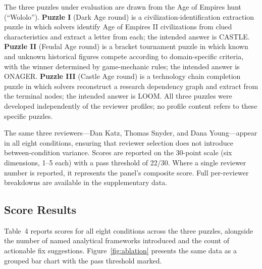 The three puzzles under evaluation are drawn from the Age of Empires hunt (``Wololo''). \textbf{Puzzle I} (Dark Age round) is a civilization-identification extraction puzzle in which solvers identify Age of Empires II civilizations from clued characteristics and extract a letter from each; the intended answer is CASTLE. \textbf{Puzzle II} (Feudal Age round) is a bracket tournament puzzle in which known and unknown historical figures compete according to domain-specific criteria, with the winner determined by game-mechanic rules; the intended answer is ONAGER. \textbf{Puzzle III} (Castle Age round) is a technology chain completion puzzle in which solvers reconstruct a research dependency graph and extract from the terminal nodes; the intended answer is LOOM. All three puzzles were developed independently of the reviewer profiles; no profile content refers to these specific puzzles.

The same three reviewers---Dan Katz, Thomas Snyder, and Dana Young---appear in all eight conditions, ensuring that reviewer selection does not introduce between-condition variance. Scores are reported on the 30-point scale (six dimensions, 1--5 each) with a pass threshold of 22/30. Where a single reviewer number is reported, it represents the panel's composite score. Full per-reviewer breakdowns are available in the supplementary data.

\subsection{Score Results}

Table~4 reports scores for all eight conditions across the three puzzles, alongside the number of named analytical frameworks introduced and the count of actionable fix suggestions. Figure~\ref{fig:ablation} presents the same data as a grouped bar chart with the pass threshold marked.



